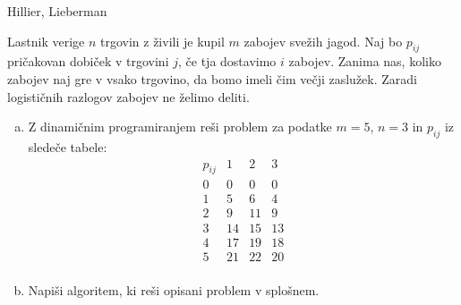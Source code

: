 \begin{naloga}{Hillier, Lieberman}{\cite[Problem~11.3-1]{hl}}
\begin{vprasanje}
Lastnik verige $n$ trgovin z živili je kupil $m$ zabojev svežih jagod.
Naj bo $p_{ij}$ pričakovan dobiček v trgovini $j$,
če tja dostavimo $i$ zabojev.
Zanima nas, koliko zabojev naj gre v vsako trgovino,
da bomo imeli čim večji zaslužek.
Zaradi logističnih razlogov zabojev ne želimo deliti.
\begin{enumerate}[(a)]
\item Z dinamičnim programiranjem reši problem za podatke $m = 5$, $n = 3$
in $p_{ij}$ iz sledeče tabele:
$$
\begin{array}{c|ccc}
p_{ij} & 1 & 2 & 3 \\
\hline
0 &  0 &  0 &  0 \\
1 &  5 &  6 &  4 \\
2 &  9 & 11 &  9 \\
3 & 14 & 15 & 13 \\
4 & 17 & 19 & 18 \\
5 & 21 & 22 & 20 \\
\end{array}
$$
\item Napiši algoritem, ki reši opisani problem v splošnem.
\end{enumerate}
\end{vprasanje}


\end{naloga}
